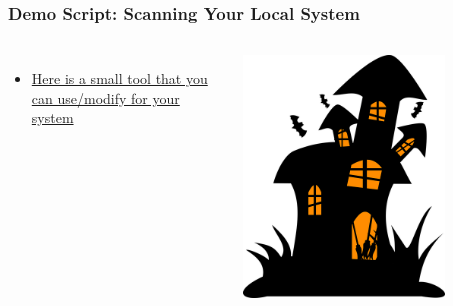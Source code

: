 \documentclass[aspectratio=169]{beamer}
\begin{document}
{
    \begin{frame}
	\frametitle{Demo Script: Scanning Your Local System}
            \begin{columns}
	\begin{itemize}
        \item\href{ https://github.com/devsecfranklin/stash-house/tree/main/demo/01_scanner}{Here is a small tool that you can use/modify for your system}
	\end{itemize}
    \includegraphics[width=0.75\textwidth]{../static/images/new_logo.png}
    \end{columns}

    \end{frame}
}
\end{document}
